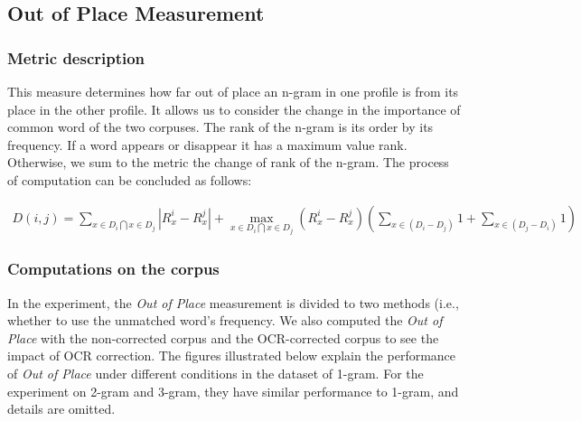 \subsection{Out of Place Measurement}

\subsubsection{Metric description}

This measure determines how far out of place an n-gram in one profile is from its place in the other profile. It allows us to consider the change in the importance of common word of the two corpuses. The rank of the n-gram is its order by its frequency. If a word appears or disappear it has a maximum value rank. Otherwise, we sum to the metric the change of rank of the n-gram. The process of computation can be concluded as follows:

\begin{eqnarray}\label{outofplace}
	D(i, j) = \sum_{x \in D_i \bigcap x \in D_j} |R_x^i - R_x^j| + 
			\max_{x \in D_i \bigcap x \in D_j}(R_x^i - R_x^j) (\sum_{x \in (D_i - D_j)} 1 + \sum_{x \in (D_j - D_i)} 1)
\end{eqnarray}

\subsubsection{Computations on the corpus}

In the experiment, the \emph{Out of Place} measurement is divided to two methods (i.e., whether to use the unmatched word's frequency. We also computed the \emph{Out of Place} with the non-corrected corpus and the OCR-corrected corpus to see the impact of OCR correction. The figures illustrated below explain the performance of \emph{Out of Place} under different conditions in the dataset of 1-gram. For the experiment on 2-gram and 3-gram, they have similar performance to 1-gram, and details are omitted.

